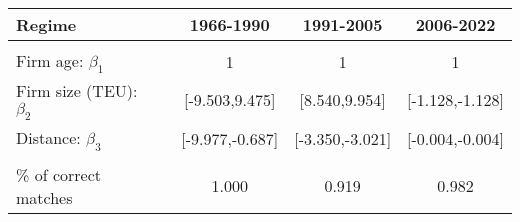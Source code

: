 
\begin{tabular}[t]{lcccc}
\toprule
Regime &  & 1966-1990 & 1991-2005 & 2006-2022\\
\midrule
 &  &  &  \vphantom{1} & \\
Firm age: $\beta_1$ &  & 1 & 1 & 1\\
Firm size (TEU): $\beta_2$ &  & {}[-9.503,9.475] & {}[8.540,9.954] & {}[-1.128,-1.128]\\
Distance: $\beta_3$ &  & {}[-9.977,-0.687] & {}[-3.350,-3.021] & {}[-0.004,-0.004]\\
 &  &  &  & \\
\% of correct matches &  & 1.000 & 0.919 & 0.982\\
\bottomrule
\end{tabular}
